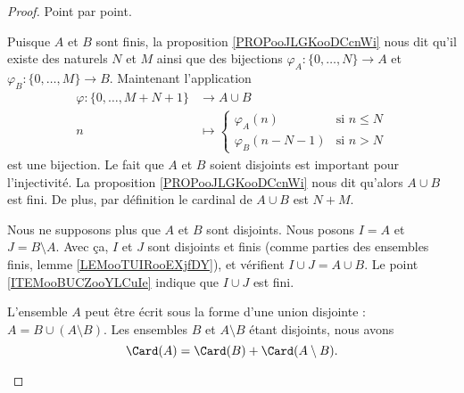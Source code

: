 \begin{proof}
	Point par point.
	\begin{subproof}
		Puisque \( A\) et \( B\) sont finis, la proposition \ref{PROPooJLGKooDCcnWi} nous dit qu'il existe des naturels \( N\) et \( M\) ainsi que des bijections \( \varphi_A\colon \{ 0,\ldots, N \}\to A\) et \( \varphi_B\colon \{ 0,\ldots, M \}\to B\). Maintenant l'application
		\begin{equation}
			\begin{aligned}
				\varphi\colon \{ 0,\ldots, M+N+1 \} & \to A\cup B                                    \\
				n                                   & \mapsto \begin{cases}
					                                              \varphi_A(n)     & \text{si }  n\leq N \\
					                                              \varphi_B(n-N-1) & \text{si } n>N
				                                              \end{cases}
			\end{aligned}
		\end{equation}
		est une bijection. Le fait que \( A\) et \( B\) soient disjoints est important pour l'injectivité.  La proposition \ref{PROPooJLGKooDCcnWi} nous dit qu'alors \( A\cup B\) est fini. De plus, par définition le cardinal de \( A\cup B\) est \( N+M\).

		Nous ne supposons plus que \( A\) et \( B\) sont disjoints. Nous posons \( I=A\) et \( J=B\setminus A\). Avec ça, \( I\) et \( J\) sont disjoints et finis (comme parties des ensembles finis, lemme \ref{LEMooTUIRooEXjfDY}), et vérifient \( I\cup J=A\cup B\). Le point \ref{ITEMooBUCZooYLCuIe} indique que \( I\cup J\) est fini.


		L'ensemble \( A\) peut être écrit sous la forme d'une union disjointe : \( A=B\cup(A\setminus B)\). Les ensembles \( B\) et \( A\setminus B\) étant disjoints, nous avons
		\begin{equation}
			\Card(A)=\Card(B)+\Card(A\setminus B).
		\end{equation}


\end{subproof}
\end{proof}
